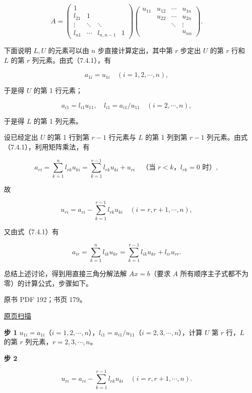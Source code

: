 \documentclass[
  10pt,
  fontset=fandol]{ctexart}
\begin{document}
\[
A=\begin{pmatrix}
1&&&\\
l_{21}&1&&\\
\vdots&\ddots&\ddots&\\
l_{n1}&\cdots&l_{n,n-1}&1
\end{pmatrix}
\begin{pmatrix}
u_{11}&u_{12}&\cdots&u_{1n}\\
&u_{22}&\cdots&u_{2n}\\
&&\ddots&\vdots\\
&&&u_{nn}
\end{pmatrix}.
\tag{7.4.1}
\]

下面说明 \(L,U\) 的元素可以由 \(n\) 步直接计算定出，其中第 \(r\) 步定出 \(U\) 的第 \(r\) 行和 \(L\) 的第 \(r\) 列元素。由式（7.4.1），有

\[a_{1i}=u_{1i}\quad(i=1,2,\cdots,n),\]

于是得 \(U\) 的第 1 行元素；

\[a_{i1}=l_{i1}u_{11},\quad l_{i1}=a_{i1}/u_{11}\quad(i=2,\cdots,n),\]

于是得 \(L\) 的第 1 列元素。

设已经定出 \(U\) 的第 1 行到第 \(r-1\) 行元素与 \(L\) 的第 1 列到第 \(r-1\) 列元素。由式（7.4.1），利用矩阵乘法，有

\[a_{ri}=\sum_{k=1}^{n}l_{rk}u_{ki}=\sum_{k=1}^{r-1}l_{rk}u_{ki}+u_{ri}\quad\text{（当 $r<k$，$l_{rk}=0$ 时）},\]

故

\[u_{ri}=a_{ri}-\sum_{k=1}^{r-1}l_{rk}u_{ki}\quad(i=r,r+1,\cdots,n),\]

又由式（7.4.1）有

\[a_{ir}=\sum_{k=1}^{n}l_{ik}u_{kr}=\sum_{k=1}^{r-1}l_{ik}u_{kr}+l_{ir}u_{rr}.\]

总结上述讨论，得到用直接三角分解法解 \(Ax=b\)（要求 \(A\) 所有顺序主子式都不为零）的计算公式，步骤如下。

\clearpage

原书 PDF 192；书页 179。

\href{/Users/xiangjunfeng/Desktop/数值计算专用/numerical-analysis/book/source-images/pdf-192.jpeg}{原页扫描}

\textbf{步 1} \(u_{1i}=a_{1i}\)（\(i=1,2,\cdots,n\)），\(l_{i1}=a_{i1}/u_{11}\)（\(i=2,3,\cdots,n\)），计算 \(U\) 第 \(r\) 行，\(L\) 的第 \(r\) 列元素，\(r=2,3,\cdots,n\)。

\textbf{步 2}

\[u_{ri}=a_{ri}-\sum_{k=1}^{r-1}l_{rk}u_{ki}\quad(i=r,r+1,\cdots,n).\tag{7.4.2}\]
\end{document}

